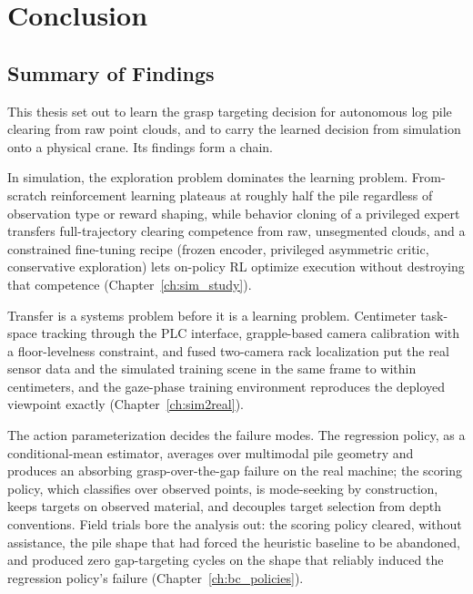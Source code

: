 
\chapter{Conclusion}
\label{ch:conclusion}

\section{Summary of Findings}

This thesis set out to learn the grasp targeting decision for autonomous log
pile clearing from raw point clouds, and to carry the learned decision from
simulation onto a physical crane. Its findings form a chain.

In simulation, the exploration problem dominates the learning problem.
From-scratch reinforcement learning plateaus at roughly half the pile
regardless of observation type or reward shaping, while behavior cloning of a
privileged expert transfers full-trajectory clearing competence from raw,
unsegmented clouds, and a constrained fine-tuning recipe (frozen encoder,
privileged asymmetric critic, conservative exploration) lets on-policy RL
optimize execution without destroying that competence
(Chapter~\ref{ch:sim_study}).

Transfer is a systems problem before it is a learning problem. Centimeter
task-space tracking through the PLC interface, grapple-based camera
calibration with a floor-levelness constraint, and fused two-camera rack
localization put the real sensor data and the simulated training scene in
the same frame to within centimeters, and the gaze-phase training
environment reproduces the deployed viewpoint exactly
(Chapter~\ref{ch:sim2real}).

The action parameterization decides the failure modes. The regression policy,
as a conditional-mean estimator, averages over multimodal pile geometry and
produces an absorbing grasp-over-the-gap failure on the real machine; the
scoring policy, which classifies over observed points, is mode-seeking by
construction, keeps targets on observed material, and decouples target
selection from depth conventions. Field trials bore the analysis out: the
scoring policy cleared, without assistance, the pile shape that had forced
the heuristic baseline to be abandoned, and produced zero gap-targeting
cycles on the shape that reliably induced the regression policy's failure
(Chapter~\ref{ch:bc_policies}).

